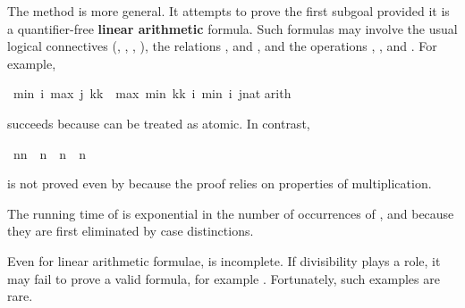 \begin{isabellebody}
\begin{isamarkuptext}
The method  is more general.  It attempts to prove
the first subgoal provided it is a quantifier-free \textbf{linear arithmetic}
formula.  Such formulas may involve the
usual logical connectives (\isa{{\isasymnot}}, \isa{{\isasymand}}, \isa{{\isasymor}},
\isa{{\isasymlongrightarrow}}), the relations \isa{{\isacharequal}}, \isa{{\isasymle}} and \isa{{\isacharless}},
and the operations
\isa{{\isacharplus}}, \isa{{\isacharminus}},  and . 
For example,%
\end{isamarkuptext}%
\ {\isachardoublequote}min\ i\ {\isacharparenleft}max\ j\ {\isacharparenleft}k{\isacharasterisk}k{\isacharparenright}{\isacharparenright}\ {\isacharequal}\ max\ {\isacharparenleft}min\ {\isacharparenleft}k{\isacharasterisk}k{\isacharparenright}\ i{\isacharparenright}\ {\isacharparenleft}min\ i\ {\isacharparenleft}j{\isacharcolon}{\isacharcolon}nat{\isacharparenright}{\isacharparenright}{\isachardoublequote}\isanewline
{}arith{\isacharparenright}%
\begin{isamarkuptext}%
\noindent
succeeds because  can be treated as atomic. In contrast,%
\end{isamarkuptext}%
\ {\isachardoublequote}n{\isacharasterisk}n\ {\isacharequal}\ n\ {\isasymLongrightarrow}\ n{\isacharequal}{}\ {\isasymor}\ n{\isacharequal}{}{\isachardoublequote}%
\begin{isamarkuptext}%
\noindent
is not proved even by  because the proof relies 
on properties of multiplication.

\begin{warn}
  The running time of  is exponential in the number of occurrences
  of ,  and
   because they are first eliminated by case distinctions.

  Even for linear arithmetic formulae,  is incomplete. If divisibility plays a
  role, it may fail to prove a valid formula, for example
  . Fortunately, such examples are rare.
\end{warn}%
\end{isamarkuptext}%
\end{isabellebody}%
